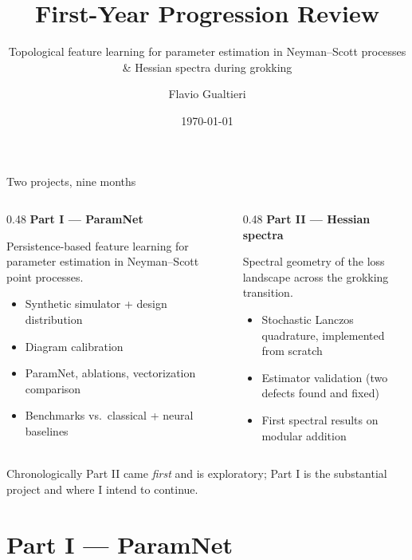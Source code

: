 \documentclass[aspectratio=169,10pt]{beamer}
\title{\bfseries First-Year Progression Review}
\subtitle{Topological feature learning for parameter estimation in
Neyman--Scott processes\\[2pt]
\small \& Hessian spectra during grokking}
\author{Flavio Gualtieri}
\institute{Queen Mary University of London}
\date{\today}
\begin{document}
\begin{frame}[plain]
 \titlepage
\end{frame}

\begin{frame}{Two projects, nine months}
\begin{columns}[T,onlytextwidth]
\begin{column}{0.48\textwidth}
  \textbf{Part I --- ParamNet}\\[2pt]
  {\footnotesize
  Persistence-based feature learning for parameter estimation in
  Neyman--Scott point processes.
  \begin{itemize}\setlength\itemsep{1pt}
    \item Synthetic simulator + design distribution
    \item Diagram calibration
    \item ParamNet, ablations, vectorization comparison
    \item Benchmarks vs.\ classical + neural baselines
  \end{itemize}}
\end{column}
\begin{column}{0.48\textwidth}
  \textbf{Part II --- Hessian spectra}\\[2pt]
  {\footnotesize
  Spectral geometry of the loss landscape across the grokking transition.
  \begin{itemize}\setlength\itemsep{1pt}
    \item Stochastic Lanczos quadrature, implemented from scratch
    \item Estimator validation (two defects found and fixed)
    \item First spectral results on modular addition
  \end{itemize}}
\end{column}
\end{columns}
\vfill
{\color{cgray}\footnotesize
Chronologically Part II came \emph{first} and is exploratory; Part I is the
substantial project and where I intend to continue.}
\end{frame}

\section{Part I --- ParamNet}
\end{document}
